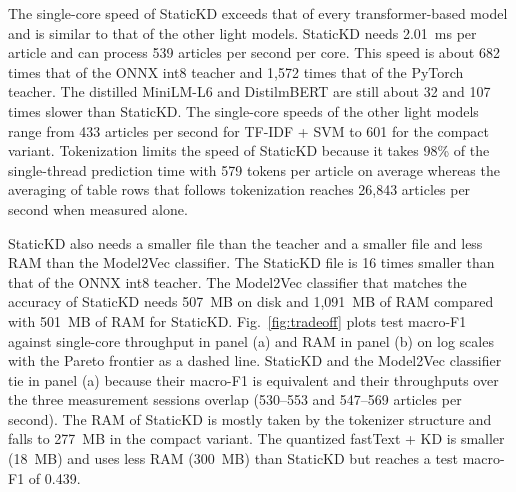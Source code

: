 \documentclass{ieeeaccess}
\begin{document}
The single-core speed of StaticKD exceeds that of every transformer-based model and is similar to that of the other light models. StaticKD needs 2.01~ms per article and can process 539 articles per second per core. This speed is about 682 times that of the ONNX int8 teacher and 1,572 times that of the PyTorch teacher. The distilled MiniLM-L6 and DistilmBERT are still about 32 and 107 times slower than StaticKD. The single-core speeds of the other light models range from 433 articles per second for TF-IDF + SVM to 601 for the compact variant. Tokenization limits the speed of StaticKD because it takes 98\% of the single-thread prediction time with 579 tokens per article on average whereas the averaging of table rows that follows tokenization reaches 26,843 articles per second when measured alone.

StaticKD also needs a smaller file than the teacher and a smaller file and less RAM than the Model2Vec classifier. The StaticKD file is 16 times smaller than that of the ONNX int8 teacher. The Model2Vec classifier that matches the accuracy of StaticKD needs 507~MB on disk and 1,091~MB of RAM compared with 501~MB of RAM for StaticKD. Fig.~\ref{fig:tradeoff} plots test macro-F1 against single-core throughput in panel (a) and RAM in panel (b) on log scales with the Pareto frontier as a dashed line. StaticKD and the Model2Vec classifier tie in panel (a) because their macro-F1 is equivalent and their throughputs over the three measurement sessions overlap (530--553 and 547--569 articles per second). The RAM of StaticKD is mostly taken by the tokenizer structure and falls to 277~MB in the compact variant. The quantized fastText + KD is smaller (18~MB) and uses less RAM (300~MB) than StaticKD but reaches a test macro-F1 of 0.439.
\end{document}

